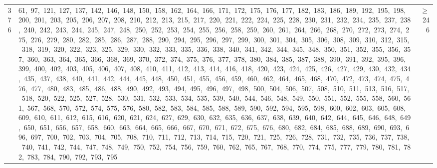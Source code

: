 \begin{longtable}{c|p{}|r}
376 & 61,\ 97,\ 121,\ 127,\ 137,\ 142,\ 146,\ 148,\ 150,\ 158,\ 162,\ 164,\ 166,\ 171,\ 172,\ 175,\ 176,\ 177,\ 182,\ 183,\ 186,\ 189,\ 192,\ 195,\ 198,\ 200,\ 201,\ 203,\ 205,\ 206,\ 207,\ 208,\ 210,\ 212,\ 213,\ 215,\ 217,\ 220,\ 221,\ 222,\ 224,\ 225,\ 228,\ 230,\ 231,\ 232,\ 234,\ 235,\ 237,\ 238,\ 240,\ 242,\ 243,\ 244,\ 245,\ 247,\ 248,\ 250,\ 252,\ 253,\ 254,\ 255,\ 256,\ 258,\ 259,\ 260,\ 261,\ 264,\ 266,\ 268,\ 270,\ 272,\ 273,\ 274,\ 275,\ 276,\ 279,\ 280,\ 282,\ 285,\ 286,\ 287,\ 288,\ 290,\ 294,\ 295,\ 296,\ 297,\ 299,\ 300,\ 301,\ 304,\ 305,\ 306,\ 308,\ 309,\ 310,\ 312,\ 315,\ 318,\ 319,\ 320,\ 322,\ 323,\ 325,\ 329,\ 330,\ 332,\ 333,\ 335,\ 336,\ 338,\ 340,\ 341,\ 342,\ 344,\ 345,\ 348,\ 350,\ 351,\ 352,\ 355,\ 356,\ 357,\ 360,\ 363,\ 364,\ 365,\ 366,\ 368,\ 369,\ 370,\ 372,\ 374,\ 375,\ 376,\ 377,\ 378,\ 380,\ 384,\ 385,\ 387,\ 388,\ 390,\ 391,\ 392,\ 395,\ 396,\ 399,\ 400,\ 402,\ 403,\ 405,\ 406,\ 407,\ 408,\ 410,\ 411,\ 412,\ 413,\ 414,\ 416,\ 418,\ 420,\ 423,\ 424,\ 425,\ 426,\ 427,\ 429,\ 430,\ 432,\ 434,\ 435,\ 437,\ 438,\ 440,\ 441,\ 442,\ 444,\ 445,\ 448,\ 450,\ 451,\ 455,\ 456,\ 459,\ 460,\ 462,\ 464,\ 465,\ 468,\ 470,\ 472,\ 473,\ 474,\ 475,\ 476,\ 477,\ 480,\ 483,\ 485,\ 486,\ 488,\ 490,\ 492,\ 493,\ 494,\ 495,\ 496,\ 497,\ 498,\ 500,\ 504,\ 506,\ 507,\ 508,\ 510,\ 511,\ 513,\ 516,\ 517,\ 518,\ 520,\ 522,\ 525,\ 527,\ 528,\ 530,\ 531,\ 532,\ 533,\ 534,\ 535,\ 539,\ 540,\ 544,\ 546,\ 548,\ 549,\ 550,\ 551,\ 552,\ 555,\ 558,\ 560,\ 561,\ 567,\ 568,\ 570,\ 572,\ 574,\ 575,\ 576,\ 580,\ 582,\ 583,\ 584,\ 585,\ 588,\ 589,\ 590,\ 592,\ 594,\ 595,\ 598,\ 600,\ 602,\ 603,\ 605,\ 608,\ 609,\ 610,\ 611,\ 612,\ 615,\ 616,\ 620,\ 621,\ 624,\ 627,\ 629,\ 630,\ 632,\ 635,\ 636,\ 637,\ 638,\ 639,\ 640,\ 642,\ 644,\ 645,\ 646,\ 648,\ 649,\ 650,\ 651,\ 656,\ 657,\ 658,\ 660,\ 663,\ 664,\ 665,\ 666,\ 667,\ 670,\ 671,\ 672,\ 675,\ 676,\ 680,\ 682,\ 684,\ 685,\ 688,\ 689,\ 690,\ 693,\ 696,\ 697,\ 700,\ 702,\ 703,\ 704,\ 705,\ 708,\ 710,\ 711,\ 712,\ 713,\ 714,\ 715,\ 720,\ 721,\ 725,\ 726,\ 728,\ 731,\ 732,\ 735,\ 736,\ 737,\ 738,\ 740,\ 741,\ 742,\ 744,\ 747,\ 748,\ 749,\ 750,\ 752,\ 754,\ 756,\ 759,\ 760,\ 762,\ 765,\ 767,\ 768,\ 770,\ 774,\ 775,\ 777,\ 779,\ 780,\ 781,\ 782,\ 783,\ 784,\ 790,\ 792,\ 793,\ 795 & $\ge$ 246 \\

\end{longtable}
